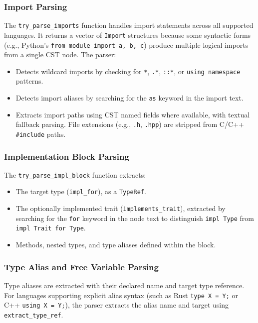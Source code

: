 \subsubsection{Import Parsing}

The \texttt{try\_parse\_imports} function handles import statements
across all supported languages. It returns a vector of
\texttt{Import} structures because some syntactic forms (e.g.,
Python's \texttt{from module import a, b, c}) produce multiple
logical imports from a single CST node. The parser:
\begin{itemize}
  \item Detects wildcard imports by checking for \texttt{*},
    \texttt{.*}, \texttt{::*}, or \texttt{using namespace} patterns.
  \item Detects import aliases by searching for the \texttt{as}
    keyword in the import text.
  \item Extracts import paths using CST named fields where available,
    with textual fallback parsing. File extensions (e.g.,
    \texttt{.h}, \texttt{.hpp}) are stripped from C/C++
    \texttt{\#include} paths.
\end{itemize}

\subsubsection{Implementation Block Parsing}

The \texttt{try\_parse\_impl\_block} function extracts:
\begin{itemize}
  \item The target type (\texttt{impl\_for}), as a \texttt{TypeRef}.
  \item The optionally implemented trait
    (\texttt{implements\_trait}), extracted by \linebreak searching for the
    \texttt{for} keyword in the node text to distinguish \texttt{impl
    Type} from \texttt{impl Trait for Type}.
  \item Methods, nested types, and type aliases defined within the block.
\end{itemize}

\subsubsection{Type Alias and Free Variable Parsing}

Type aliases are extracted with their declared name and target type reference.
For languages supporting explicit alias syntax (such as Rust
  \texttt{type X = Y;}
or C++ \texttt{using X = Y;}), the parser extracts the alias name and target
using \texttt{extract\_type\_ref}.

